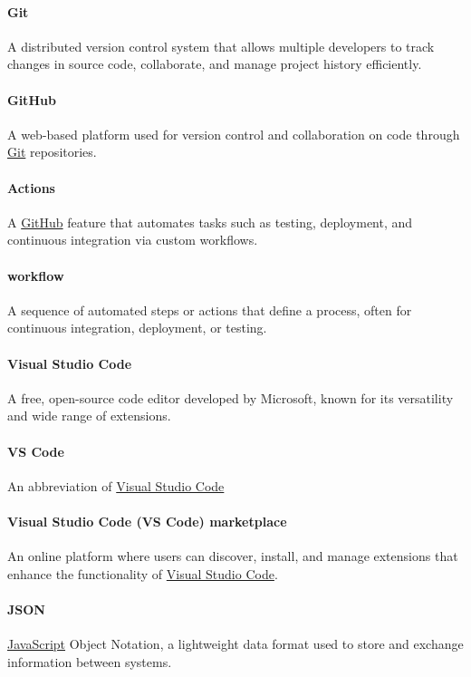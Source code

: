 \documentclass[12pt]{article}
\begin{document}
\paragraph*{Git}
\label{term:git}
A distributed version control system that allows multiple developers to track changes in source code, collaborate, and manage project history efficiently.

\paragraph*{GitHub}
\label{term:GitH}
A web-based platform used for version control and collaboration on code through \hyperref[term:git]{Git} repositories.

\paragraph*{Actions}
A \hyperref[term:GitH]{GitHub} feature that automates tasks such as testing, deployment, and continuous integration via custom workflows.

\paragraph*{workflow}
A sequence of automated steps or actions that define a process, often for continuous integration, deployment, or testing.

\paragraph*{Visual Studio Code}
\label{term:VSC}
A free, open-source code editor developed by Microsoft, known for its versatility and wide range of extensions.

\paragraph*{VS Code}
An abbreviation of \hyperref[term:VSC]{Visual Studio Code}

\paragraph*{Visual Studio Code (VS Code) marketplace}
An online platform where users can discover, install, and manage extensions that enhance the functionality of \hyperref[term:VSC]{Visual Studio Code}.

\paragraph*{JSON}
\label{term:JSON}
\hyperref[term:JS]{JavaScript} Object Notation, a lightweight data format used to store and exchange information between systems.
\end{document}
